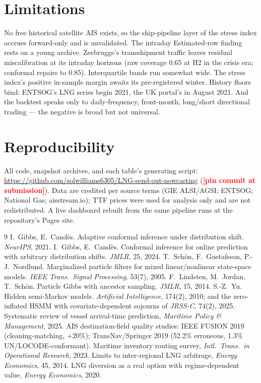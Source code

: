 \documentclass[11pt]{article}
\newcommand{\todo}[1]{\textcolor{red}{\textbf{[#1]}}}
\begin{document}
\section{Limitations}
No free historical satellite AIS exists, so the ship-pipeline layer of
the stress index accrues forward-only and is unvalidated. The intraday
Estimated-row finding rests on a young archive. Zeebrugge's transshipment
traffic leaves residual miscalibration at its intraday horizons (raw
coverage 0.65 at H2 in the crisis era; conformal repairs to 0.85).
Interquartile bands run somewhat wide. The stress index's positive
in-sample margin awaits its pre-registered winter. History floors bind:
ENTSOG's LNG series begin 2021, the UK portal's in August 2021. And the
backtest speaks only to daily-frequency, front-month, long/short
directional trading --- the negative is broad but not universal.

\section*{Reproducibility}
All code, snapshot archives, and each table's generating script:
\url{https://github.com/solwilliams6305/LNG-send-out-nowcasting}
(\todo{pin commit at submission}). Data are credited per source terms
(GIE ALSI/AGSI; ENTSOG; National Gas; aisstream.io); TTF prices were used
for analysis only and are not redistributed. A live dashboard rebuilt from
the same pipeline runs at the repository's Pages site.

\begin{thebibliography}{9}\small
{} I.~Gibbs, E.~Cand\`es. Adaptive conformal inference
under distribution shift. \emph{NeurIPS}, 2021.
 I.~Gibbs, E.~Cand\`es. Conformal inference for online
prediction with arbitrary distribution shifts. \emph{JMLR}, 25, 2024.
 T.~Sch\"on, F.~Gustafsson, P.-J.~Nordlund. Marginalized
particle filters for mixed linear/nonlinear state-space models.
\emph{IEEE Trans.\ Signal Processing}, 53(7), 2005.
 F.~Lindsten, M.~Jordan, T.~Sch\"on. Particle Gibbs
with ancestor sampling. \emph{JMLR}, 15, 2014.
 S.-Z.~Yu. Hidden semi-Markov models. \emph{Artificial
Intelligence}, 174(2), 2010; and the zero-inflated HSMM with
covariate-dependent sojourns of \emph{JRSS-C}, 74(2), 2025.
 Systematic review of vessel arrival-time prediction,
\emph{Maritime Policy \& Management}, 2025.
 AIS destination-field quality studies: IEEE FUSION
2019 (cleaning-matching, $+20\%$); TransNav/Springer 2019 (52.2\%
erroneous, 1.3\% UN/LOCODE-conformant).
 Maritime inventory routing survey, \emph{Intl.\ Trans.\ in
Operational Research}, 2023.
 Limits to inter-regional LNG arbitrage,
\emph{Energy Economics}, 45, 2014.
 LNG diversion as a real option with
regime-dependent value, \emph{Energy Economics}, 2020.
\end{thebibliography}
\end{document}
